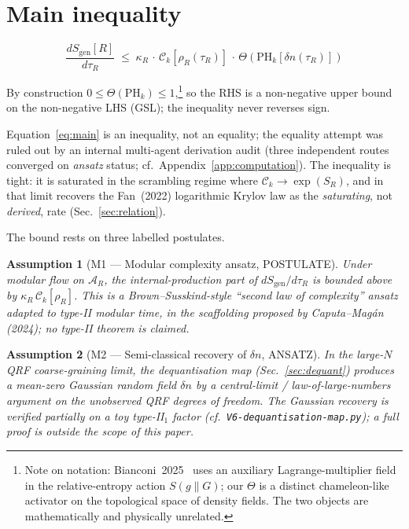 \documentclass[aps,prd,superscriptaddress,nofootinbib,floatfix,10pt]{revtex4-2}
\newtheorem{assumption}{Assumption}
\theoremstyle{remark}
\newcommand{\Sgen}{S_{\mathrm{gen}}}
\newcommand{\tauR}{\tau_{R}}
\newcommand{\kR}{\kappa_{R}}
\newcommand{\Ck}{\mathcal{C}_{k}}
\newcommand{\PHk}{\mathrm{PH}_{k}}
\newcommand{\dn}{\delta n}
\newcommand{\AR}{\mathcal{A}_{R}}
\begin{document}
\section{Main inequality}
\label{sec:main}

\begin{tcolorbox}[colback=blue!3,colframe=blue!50,title=Main result (Theorem~\ref{thm:main})]
\begin{equation}
 \boxed{\;
  \frac{d\Sgen[R]}{d\tauR}
  \;\le\;
  \kR \,\cdot\, \Ck\!\left[\rho_{R}(\tauR)\right]
       \,\cdot\, \Theta\!\left(\PHk[\dn(\tauR)]\right)
 \;}
 \label{eq:main}
\end{equation}
\end{tcolorbox}

By construction $0 \le \Theta(\PHk) \le 1$,\footnote{Note on notation:
Bianconi~2025~\cite{Bianconi2025} uses an auxiliary Lagrange-multiplier
field in the relative-entropy action $S(g\|G)$; our $\Theta$ is a
distinct chameleon-like activator on the topological space of density
fields. The two objects are mathematically and physically unrelated.}
so the RHS is a non-negative upper bound on the non-negative LHS (GSL);
the inequality never reverses sign.

Equation~\eqref{eq:main} is an inequality, not an equality; the
equality attempt was ruled out by an internal multi-agent derivation
audit (three independent routes converged on \emph{ansatz} status;
cf.\ Appendix~\ref{app:computation}). The inequality is tight: it is
saturated in the scrambling regime where
$\Ck\to\exp(S_{R})$, and in that limit recovers the Fan~(2022)
logarithmic Krylov law as the \emph{saturating}, not \emph{derived},
rate (Sec.~\ref{sec:relation}).

The bound rests on three labelled postulates.

\begin{assumption}[M1 --- Modular complexity ansatz, POSTULATE]
\label{ass:M1}
Under modular flow on $\AR$, the internal-production part of
$d\Sgen/d\tauR$ is bounded above by $\kR\,\Ck[\rho_{R}]$. This is a
Brown--Susskind-style ``second law of complexity'' ansatz adapted to
type-II modular time, in the scaffolding proposed by
Caputa--Mag\'an (2024); no type-II theorem is claimed.
\end{assumption}

\begin{assumption}[M2 --- Semi-classical recovery of $\dn$, ANSATZ]
\label{ass:M2}
In the large-$N$ QRF coarse-graining limit, the dequantisation map
(Sec.~\ref{sec:dequant}) produces a mean-zero Gaussian random field
$\dn$ by a central-limit / law-of-large-numbers argument on the
unobserved QRF degrees of freedom. The Gaussian recovery is verified
partially on a toy type-II$_{1}$ factor
(cf.\ \texttt{V6-dequantisation-map.py}); a full proof is outside the
scope of this paper.
\end{assumption}
\end{document}
